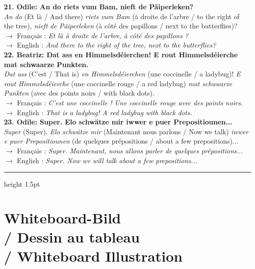 \noindent\textbf{21. Odile: An do riets vum Bam, nieft de Päiperleken?}\\
\textit{An do} (Et là / And there) \textit{riets vum Bam} (à droite de l'arbre / to the right of the tree), \textit{nieft de Päiperleken} (à côté des papillons / next to the butterflies)?\\
$\rightarrow$ Français : \textit{Et là à droite de l'arbre, à côté des papillons ?}\\
$\rightarrow$ English : \textit{And there to the right of the tree, next to the butterflies?}\\[0.5em]

\noindent\textbf{22. Beatriz: Dat ass en Himmelsdéierchen! E rout Himmelsdéierche mat schwaarze Punkten.}\\
\textit{Dat ass} (C'est / That is) \textit{en Himmelsdéierchen} (une coccinelle / a ladybug)! \textit{E rout Himmelsdéierche} (une coccinelle rouge / a red ladybug) \textit{mat schwaarze Punkten} (avec des points noirs / with black dots).\\
$\rightarrow$ Français : \textit{C'est une coccinelle ! Une coccinelle rouge avec des points noirs.}\\
$\rightarrow$ English : \textit{That is a ladybug! A red ladybug with black dots.}\\[0.5em]

\noindent\textbf{23. Odile: Super. Elo schwätze mir iwwer e puer Prepositiounen...}\\
\textit{Super} (Super). \textit{Elo schwätze mir} (Maintenant nous parlons / Now we talk) \textit{iwwer e puer Prepositiounen} (de quelques prépositions / about a few prepositions)...\\
$\rightarrow$ Français : \textit{Super. Maintenant, nous allons parler de quelques prépositions...}\\
$\rightarrow$ English : \textit{Super. Now we will talk about a few prepositions...}

\vspace{1.5cm}
\color{geminiBlue}\hrule height 1.5pt \vspace{0.5em}\color{black}

\section[Whiteboard-Bild / Dessin au tableau / Whiteboard Illustration]{Whiteboard-Bild \\/ Dessin au tableau \\/ Whiteboard Illustration}

